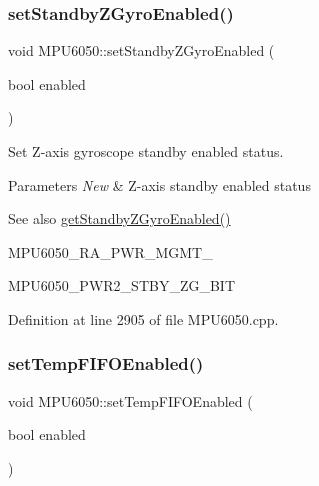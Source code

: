\mbox{\label{classMPU6050_ada7c8a873fe157703dcdc08e25b48e32}} 
\subsubsection{\texorpdfstring{setStandbyZGyroEnabled()}{setStandbyZGyroEnabled()}}
{\footnotesize\ttfamily void M\+P\+U6050\+::set\+Standby\+Z\+Gyro\+Enabled (\begin{DoxyParamCaption}\item[{bool}]{enabled }\end{DoxyParamCaption})}



Set Z-\/axis gyroscope standby enabled status. 


\begin{DoxyParams}{Parameters}
{\em New} & Z-\/axis standby enabled status \\
\hline
\end{DoxyParams}
\begin{DoxySeeAlso}{See also}
\mbox{\hyperlink{classMPU6050_a20f7804db1a980a3c425ae44c33d420b}{get\+Standby\+Z\+Gyro\+Enabled()}} 

M\+P\+U6050\+\_\+\+R\+A\+\_\+\+P\+W\+R\+\_\+\+M\+G\+M\+T\+\_ 

M\+P\+U6050\+\_\+\+P\+W\+R2\+\_\+\+S\+T\+B\+Y\+\_\+\+Z\+G\+\_\+\+B\+IT 
\end{DoxySeeAlso}


Definition at line 2905 of file M\+P\+U6050.\+cpp.

\mbox{\label{classMPU6050_ae528a25b4997ad0e3091a012e4e4419e}} 
\subsubsection{\texorpdfstring{setTempFIFOEnabled()}{setTempFIFOEnabled()}}
{\footnotesize\ttfamily void M\+P\+U6050\+::set\+Temp\+F\+I\+F\+O\+Enabled (\begin{DoxyParamCaption}\item[{bool}]{enabled }\end{DoxyParamCaption})}




